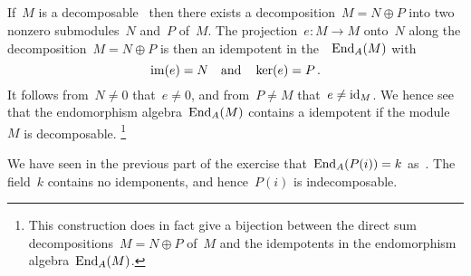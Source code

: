 \subsection{}

If~$M$ is a decomposable~{} then there exists a decomposition~$M = N \oplus P$ into two nonzero submodules~$N$ and~$P$ of~$M$.
The projection~$e \colon M \to M$ onto~$N$ along the decomposition~$M = N \oplus P$ is then an idempotent in the~{\kalg}~$\operatorname{End}_A(M)$ with
\[
  \operatorname{im}(e) = N
  \quad\text{and}\quad
  \ker(e) = P \,.
\]
It follows from~$N \neq 0$ that~$e \neq 0$, and from~$P \neq M$ that~$e \neq \operatorname{id}_M$.
We hence see that the endomorphism algebra~$\operatorname{End}_A(M)$ contains a  idempotent if the module~$M$ is decomposable.%
\footnote{This construction does in fact give a bijection between the direct sum decompositions~$M = N \oplus P$ of~$M$ and the idempotents in the endomorphism algebra~$\operatorname{End}_A(M)$.}

We have seen in the previous part of the exercise that~$\operatorname{End}_A(P(i)) = k$ as~{\kalgs}.
The field~$k$ contains no  idemponents, and hence~$P(i)$ is indecomposable.




